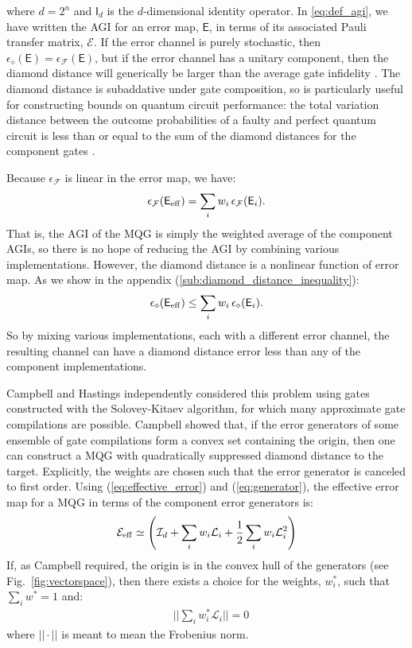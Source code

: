 \documentclass[aps,nofootinbib,pra,notitlepage,twocolumn]{revtex4-1}
\newcommand{\error}{\ensuremath{{\mathsf{E}}}}
\begin{document}
where $d=2^n$ and $\mathsf{I}_d$ is the $d$-dimensional identity operator.  In \ref{eq:def_agi}, we have written the AGI for an error map, $\mathsf{E}$, in terms of its associated Pauli transfer matrix, $\mathcal{E}$. If the error channel is purely stochastic, then $\epsilon_\diamond(\error) = \epsilon_\mathcal{F}(\error)$, but if the error channel has a unitary component, then the diamond distance will generically be larger than the average gate infidelity \cite{1511.00727}. The diamond distance is subaddative \cite{watrous2018theory} under gate composition, so is particularly useful for constructing bounds on quantum circuit performance: the total variation distance between the outcome probabilities of a faulty and perfect quantum circuit is less than or equal to the sum of the diamond distances for the component gates \cite{aharonov1998quantum}. 

Because $\epsilon_{\mathcal{F}}$ is linear in the error map, we have:
\begin{equation}
	\epsilon_{\mathcal{F}}\!\left(\mathsf{E}_{\rm eff}\right) = \sum_i w_i \,\epsilon_{\mathcal{F}}(\mathsf{E}_i).
\end{equation}
That is, the AGI of the MQG is simply the weighted average of the component AGIs, so there is no hope of reducing the AGI by combining various implementations. However, the diamond distance is a nonlinear function of error map. As we show in the appendix (\ref{sub:diamond_distance_inequality}):
\begin{equation}
	\label{eq:diamond_ineq}
	\epsilon_\diamond\!\left(\mathsf{E}_{\rm eff}\right) \le \sum_i w_i \, \epsilon_\diamond(\mathsf{E}_i).
\end{equation}
So by mixing various implementations, each with a different error channel, the resulting channel can have a diamond distance error less than any of the component implementations. 

Campbell \cite{Campbell2017} and Hastings \cite{1612.01011} independently considered this problem using gates constructed with the Solovey-Kitaev algorithm, for which many approximate gate compilations are possible. Campbell showed that, if the error generators of some ensemble of gate compilations form a convex set containing the origin, then one can construct a MQG with quadratically suppressed diamond distance to the target. Explicitly, the weights are chosen such that the error generator is canceled to first order. Using (\ref{eq:effective_error}) and (\ref{eq:generator}), the effective error map for a MQG in terms of the component error generators is:
\begin{align}
	\label{eq:generators_and_effective_error}
	\mathcal{E}_{\rm eff} \simeq \left(\mathcal{I}_d + \sum_i w_i \mathcal{L}_i + \frac{1}{2} \sum_i w_i \mathcal{L}_i^2\right)
\end{align}
If, as Campbell required, the origin is in the convex hull of the generators (see Fig.~\ref{fig:vectorspace}), then there exists a choice for the weights, $w_i^*$, such that $\sum_i w^*=1$ and:
\begin{align}
	\label{eq:cancel}
	&||\sum_i w_i^* \mathcal{L}_i||= 0
\end{align}
where $||\cdot||$ is meant to mean the Frobenius norm.
\end{document}
